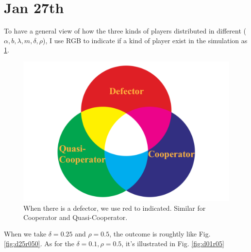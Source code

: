 \documentclass{article}
\begin{document}
\section{Jan 27th}

To have a general view of how the three kinds of players distributed in different ($\alpha, b,\lambda, m, \delta,\rho$), I use RGB to indicate if a kind of player exist in the simulation as \ref{fig:rgb}. 

\begin{figure}[h]
    \centering
    \includegraphics[width=\textwidth]{rgb-color-model-1024x694.png}
    \caption{When there is a defector, we use red to indicated. Similar for Cooperator and Quasi-Cooperator.}
    \label{fig:rgb}
\end{figure}

When we take $\delta = 0.25$ and $\rho = 0.5$, the outcome is roughtly like Fig.\ref{fig:d25r050}. As for the $\delta = 0.1, \rho = 0.5$, it's illustrated in Fig. \ref{fig:d01r05}
\end{document}
